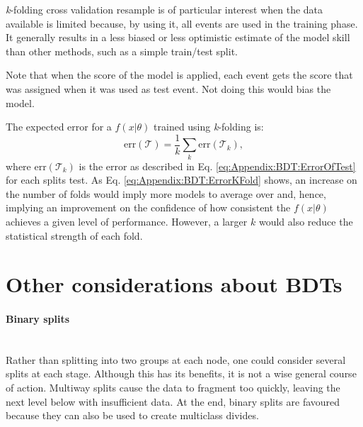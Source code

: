 \textit{k}-folding cross validation resample is of particular interest when the data available is limited 
because, by using it, all events are used in the training phase.  It generally results in a less biased 
or less optimistic estimate of the model skill than other methods, such as a simple train/test split.

Note that when the score of the model is applied, each event gets the score that was assigned when
it was used as test event. Not doing this would bias the model.

The expected error for a $f(x|\theta)$ trained using \textit{k}-folding is:
\begin{equation}
\label{eq:Appendix:BDT:ErrorKFold}
	\text{err}(\mathcal{T}) = \frac{1}{k} \sum_{k} \text{err}(\mathcal{T}_{k}) ,
\end{equation}
where $\text{err}(\mathcal{T}_{k})$ is the error as described in Eq. \ref{eq:Appendix:BDT:ErrorOfTest} for each splits test.
As Eq. \ref{eq:Appendix:BDT:ErrorKFold} shows, an increase on the number of folds would imply more
models to average over and, hence, implying an improvement on the confidence of how consistent 
the $f(x|\theta)$ achieves a given level of performance. However, a larger $k$ would also reduce
the statistical strength of each fold.





\section{Other considerations about BDTs}
\label{chap:Appendix:BDT:Concepts}
\paragraph{Binary splits}\mbox{}\\
Rather than splitting into two groups at each node, one could consider
several splits at each stage. Although this has its benefits, it is not a wise 
general course of action. Multiway splits cause the data to fragment too quickly, 
leaving the next level below with insufficient data. At the end, binary splits are 
favoured because they can also be used to create multiclass divides.



